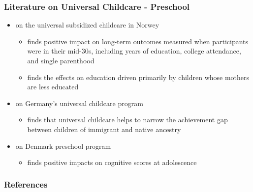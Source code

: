 \documentclass{beamer}
\begin{document}
\begin{frame}
	\frametitle{Literature on Universal Childcare - Preschool}
	\begin{itemize}
	\item \citet{Havnes_Mogstad_2011_AEJEP} on the universal subsidized childcare in Norwey
	 \begin{itemize}
	 \item finds positive impact on long-term outcomes measured when participants were in their mid-30s, including years of education, college attendance, and single parenthood
	 \item finds the effects on education driven primarily by children whose mothers are less educated
	 \end{itemize}
	\item \citet{Dustmann_Raute_2012_Germany} on Germany's universal childcare program 
		\begin{itemize}
		\item finds that universal childcare helps to narrow the achievement gap between children of immigrant and native ancestry
		\end{itemize}
	\item \citet{Esping-Anderson_2011_Denmark} on Denmark preschool program
		\begin{itemize}
		\item finds positive impacts on cognitive scores at adolescence
		\end{itemize}		 
	\end{itemize}	
\end{frame}

\begin{frame}
\frametitle{References}
\footnotesize


\end{frame}
\end{document}
